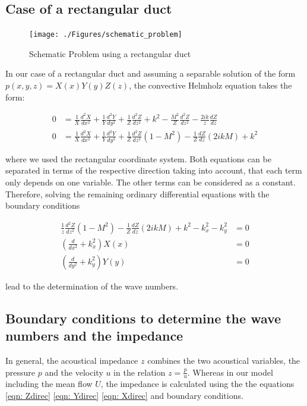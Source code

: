 \documentclass[11pt]{report} %
\begin{document}
\subsection{Case of a rectangular duct}
\begin{figure}[H]
\centering
\texttt{[image: ./Figures/schematic\_problem]}
\caption{Schematic Problem using a rectangular duct}
\end{figure}

In our case of a rectangular duct and assuming a separable solution of the form  $p(x,y,z) = X(x)Y(y)Z(z)$, the convective Helmholz equation takes the form: 

\begin{subequations}
\begin{align}
0&=\frac{1}{X} \frac{d^2X}{dx^2}+\frac{1}{Y} \frac{d^2Y}{dy^2}+\frac{1}{Z} \frac{d^2Z}{dz^2} +k^2 -\frac{M^2}{Z}\frac{d^2Z}{dz^2}-\frac{2ik}{z} \frac{dZ}{dz}\\
0&=\frac{1}{X} \frac{d^2X}{dx^2}+\frac{1}{Y} \frac{d^2Y}{dy^2}+\frac{1}{Z} \frac{d^2Z}{dz^2}(1-M^2) -\frac{1}{Z}\frac{dZ}{dz}(2ikM)+k^2 	
\end{align}
\end{subequations}

where we used the rectangular coordinate system.
Both equations can be separated in terms of the respective direction taking into account, that each term only depends on one variable. 
The other terms can be considered as a constant. 
Therefore,  solving the remaining ordinary differential equations with the boundary conditions

\begin{subequations}
\begin{align}
\frac{1}{z}\frac{d^2Z}{dz^2}(1-M^2)-\frac{1}{Z}\frac{dZ}{dz}(2ikM)+k^2-k_x^2-k_y^2&=0 \label{eqn: Zdirec} \\
\left( \frac{d}{dx^2}+k_x^2\right)X(x)&=0 \label{eqn: Ydirec} \\
\left( \frac{d}{dy^2}+k_y^2\right)Y(y)&=0 \label{eqn: Xdirec}
\end{align}
\end{subequations} 

lead to the determination of the wave numbers.   

\subsection{Boundary conditions to determine the wave numbers and the impedance}
In general, the acoustical impedance $z$ combines the two acoustical variables, the pressure $p$ and the velocity $u$ in the relation $z=\frac{p}{u}$. 
Whereas in our model including the mean flow $U$, the impedance is calculated using the the equations \ref{eqn: Zdirec} \ref{eqn: Ydirec} \ref{eqn: Xdirec} and boundary conditions. 
\end{document}
